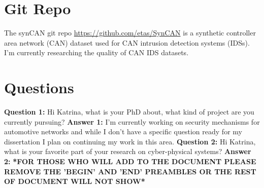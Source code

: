\section{Git Repo}
The synCAN git repo \url{https://github.com/etas/SynCAN} is a synthetic 
controller area network (CAN) dataset used for CAN intrusion detection 
systems (IDSs). I'm currently researching the quality of CAN IDS datasets.

\section{Questions}
\textbf{Question 1:}
Hi Katrina, what is your PhD about, what kind of project are you currently pursuing?
\newline
\textbf{Answer 1:} I'm currently working on security mechanisms for automotive networks and while I don't have a specific question ready for my dissertation I plan on continuing my work in this area.  
\newline
\textbf{Question 2:}
Hi Katrina, what is your favorite part of your research on cyber-physical systems?
\newline
\textbf{Answer 2:}
\newline
\textbf{*FOR THOSE WHO WILL ADD TO THE DOCUMENT PLEASE REMOVE THE 'BEGIN' AND 'END' PREAMBLES OR THE REST OF DOCUMENT WILL NOT SHOW*}
